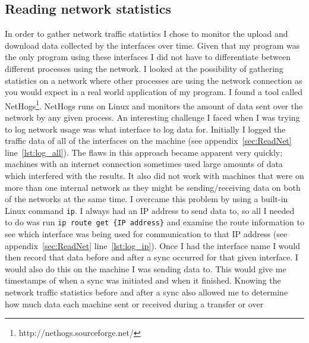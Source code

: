 \documentclass[12pt]{article}
\begin{document}
\subsection{Reading network statistics}
\label{sec:iface_mon}
In order to gather network traffic statistics
I chose to monitor the upload and download
data collected by the interfaces over time.
Given that my program was the only program
using these interfaces I did not have to
differentiate between different processes
using the network.
I looked at the possibility of gathering
statistics on a network where other processes
are using the network connection as you
would expect in a real world application
of my program. I found a tool called
NetHogs\footnote{http://nethogs.sourceforge.net/}.
NetHogs runs on Linux and monitors the
amount of data sent over the network by any
given process.
An interesting challenge I faced when I was trying
to log network usage was what interface to log
data for. Initially I logged the traffic data of all of the
interfaces on the machine (see appendix~\ref{sec:ReadNet}
line~\ref{lst:log_all}). The flaws in this approach
became apparent very quickly; machines with an
internet connection sometimes used large amounts
of data which interfered with the results. It also did not work
with machines that were on more than one internal
network as they might be sending/receiving data
on both of the networks at the same time. I overcame
this problem by using a built-in Linux command \texttt{ip}.
I always had an IP address to send data to, so all
I needed to do was run \texttt{ip route get \{IP address\}}
and examine the route information to see which interface
was being used for communication to that IP 
address (see appendix~\ref{sec:ReadNet} line~\ref{lst:log_ip}).
Once I had the interface name I would then record that
data before and after a sync occurred for that given
interface. I would also do this on the machine I
was sending data to. This would give me timestamps
of when a sync was initiated and when it finished.
Knowing the network traffic statistics before and after
a sync also allowed me to determine how much data each
machine sent or received during a transfer or over
\end{document}

